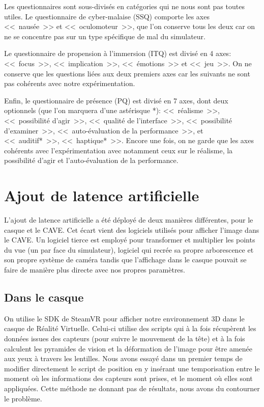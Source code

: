 	\par Les questionnaires sont sous-divisés en catégories qui ne nous sont pas toutes utiles. Le questionnaire de cyber-malaise (SSQ) comporte les axes <<~nausée~>> et <<~oculomoteur~>>, que l'on conserve tous les deux car on ne se concentre pas sur un type spécifique de mal du simulateur.
	
	\par Le questionnaire de propension à l'immersion (ITQ) est divisé en 4 axes: <<~focus~>>, <<~implication~>>, <<~émotions~>> et <<~jeu~>>. On ne conserve que les questions liées aux deux premiers axes car les suivants ne sont pas cohérents avec notre expérimentation.
	
	\par Enfin, le questionnaire de présence (PQ) est divisé en 7 axes, dont deux optionnels (que l'on marquera d'une astérisque *): <<~réalisme~>>, <<~possibilité d'agir~>>, <<~qualité de l'interface~>>, <<~possibilité d'examiner~>>, <<~auto-évaluation de la performance~>>, et <<~auditif*~>>, <<~haptique*~>>. Encore une fois, on ne garde que les axes cohérents avec l'expérimentation avec notamment ceux sur le réalisme, la possibilité d'agir et l'auto-évaluation de la performance.
		
	\section{Ajout de latence artificielle}
	\label{sec:ajout_latence_artificielle}
	\par L'ajout de latence artificielle a été déployé de deux manières différentes, pour le casque et le CAVE. Cet écart vient des logiciels utilisés pour afficher l'image dans le CAVE. Un logiciel tierce est employé pour transformer et multiplier les points du vue (un par face du simulateur), logiciel qui recrée sa propre arborescence et son propre système de caméra tandis que l'affichage dans le casque pouvait se faire de manière plus directe avec nos propres paramètres.
	
	\subsection{Dans le casque}
	\par On utilise le SDK de SteamVR pour afficher notre environnement 3D dans le casque de Réalité Virtuelle. Celui-ci utilise des scripts qui à la fois récupèrent les données issues des capteurs (pour suivre le mouvement de la tête) et à la fois calculent les pyramides de vision et la déformation de l'image pour être amenée aux yeux à travers les lentilles. Nous avons essayé dans un premier temps de modifier directement le script de position en y insérant une temporisation entre le moment où les informations des capteurs sont prises, et le moment où elles sont appliquées. Cette méthode ne donnant pas de résultats, nous avons du contourner le problème.
	
